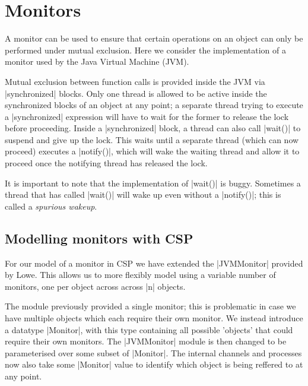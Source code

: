 \inlineScala
\section{Monitors}

A monitor can be used to ensure that certain operations on an object can only be performed under mutual exclusion. Here we consider the implementation of a monitor used by the Java Virtual Machine (JVM).

Mutual exclusion between function calls is provided inside the JVM via |synchronized| blocks. Only one thread is allowed to be active inside the synchronized blocks of an object at any point; a separate thread trying to execute a |synchronized| expression will have to wait for the former to release the lock before proceeding. Inside a |synchronized| block, a thread can also call |wait()| to suspend and give up the lock. This waits until a separate thread (which can now proceed) executes a |notify()|, which will wake the waiting thread and allow it to proceed once the notifying thread has released the lock.

It is important to note that the implementation of |wait()| is buggy. Sometimes a thread that has called |wait()| will wake up even without a |notify()|; this is called a \emph{spurious wakeup}.




\subsection{Modelling monitors with CSP}

For our model of a monitor in CSP we have extended the |JVMMonitor| provided by Lowe. This allows us to more flexibly model using a variable number of monitors, one per object across across |n| objects.

The module previously provided a single monitor; this is problematic in case we have multiple objects which each require their own monitor. We instead introduce a datatype |Monitor|, with this type containing all possible 'objects' that could require their own monitors. The |JVMMonitor| module is then changed to be parameterised over some subset of |Monitor|. The internal channels and processes now also take some |Monitor| value to identify which object is being reffered to at any point.


